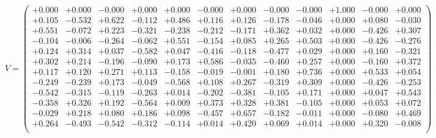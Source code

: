 \documentclass[9pt]{article}
\theoremstyle{plain}
\theoremstyle{definition}
\theoremstyle{remark}
\numberwithin{equation}{section}
\begin{document}
$V = \left(
\begin{array}{
cccccccccccc}
+0.000 & +0.000 & -0.000 & +0.000 & +0.000 & -0.000 & +0.000 & -0.000 & -0.000 & +1.000 & -0.000 & +0.000 \\
+0.105 & -0.532 & +0.622 & -0.112 & +0.486 & +0.116 & +0.126 & -0.178 & -0.046 & +0.000 & +0.080 & -0.030 \\
+0.551 & -0.072 & +0.223 & -0.321 & -0.238 & -0.212 & -0.171 & +0.362 & +0.032 & +0.000 & -0.426 & +0.307 \\
-0.104 & -0.006 & -0.264 & -0.062 & +0.551 & -0.154 & +0.085 & +0.265 & +0.503 & +0.000 & -0.426 & -0.276 \\
+0.124 & +0.314 & +0.037 & -0.582 & +0.047 & -0.416 & -0.118 & -0.477 & +0.029 & +0.000 & +0.160 & -0.321 \\
+0.302 & +0.214 & -0.196 & -0.090 & +0.173 & +0.586 & -0.035 & -0.460 & +0.257 & +0.000 & -0.160 & +0.372 \\
+0.117 & +0.120 & +0.271 & +0.113 & -0.158 & -0.019 & -0.001 & +0.180 & +0.736 & +0.000 & +0.533 & +0.054 \\
-0.249 & -0.239 & +0.173 & -0.049 & -0.568 & +0.108 & +0.267 & -0.319 & +0.309 & +0.000 & -0.426 & -0.253 \\
-0.542 & -0.315 & -0.119 & -0.263 & +0.014 & -0.202 & -0.381 & -0.105 & +0.171 & +0.000 & +0.047 & +0.543 \\
-0.358 & +0.326 & +0.192 & -0.564 & +0.009 & +0.373 & +0.328 & +0.381 & -0.105 & +0.000 & +0.053 & +0.072 \\
-0.029 & +0.218 & +0.080 & +0.186 & +0.098 & -0.457 & +0.657 & -0.182 & -0.011 & +0.000 & -0.080 & +0.469 \\
+0.264 & -0.493 & -0.542 & -0.312 & -0.114 & +0.014 & +0.420 & +0.069 & +0.014 & +0.000 & +0.320 & -0.008 \\
\end{array}
\right)$ \newline 
\end{document}
